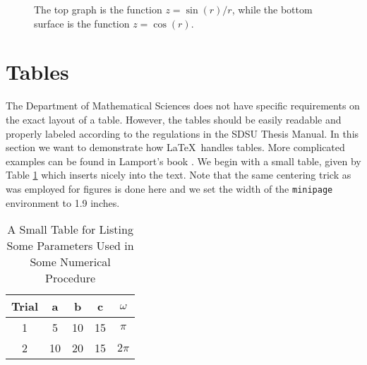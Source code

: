%
%



\begin{figure}[htb]
\centering
\begin{minipage}{3.5in}
\hspace*{-0.5in}
\newline
\hspace*{-0.5in}
\caption{The top graph is the function $z = \sin(r)/r$, while
the bottom surface is the function $z = \cos(r)$. \label{fullfig}}
\end{minipage}
\end{figure}

\section{Tables}
\label{s:tables}

The Department of Mathematical Sciences does not have specific
requirements on the exact layout of a table. However, the tables should
be easily readable and properly labeled according to the regulations in
the SDSU Thesis Manual. In this section we want to demonstrate how
\LaTeX\ handles tables. More complicated examples can be found in
Lamport's book \cite{LAM}. We begin with a small table, given by
Table \ref{tab1} which inserts nicely into the text.  Note that the same
centering trick as was employed for figures is done here and we set the
width of the {\tt minipage} environment to 1.9 inches.
%

\begin{table}[hbt]
\centering
\begin{minipage}{1.9in}
 \caption{A Small Table for Listing Some Parameters Used in Some
          Numerical Procedure\label{tab1}}
 \begin{tabular}{|c||c|c|c|c||}    \hline
  Trial &	a  &  b & c & $\omega$ \\ \hline \hline
  1 & 5 & 10  & 15 & $\pi$ \\ \hline
  2 & 10 & 20  & 15 & $2\pi$ \\ \hline
 \end{tabular}
\end{minipage}
\end{table}
%

